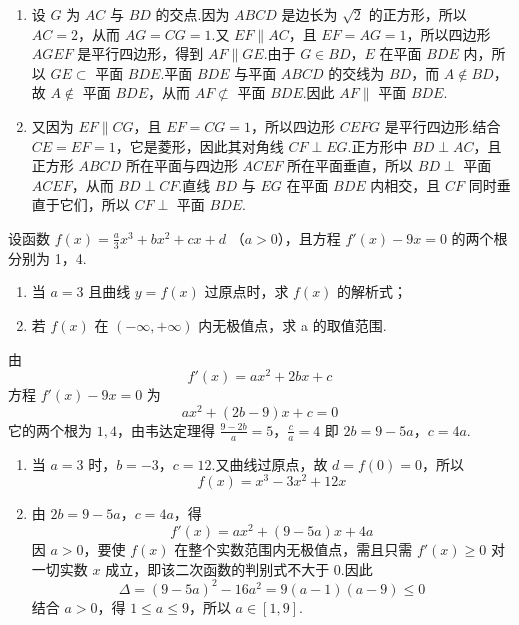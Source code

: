 \begin{solution}
\begin{enumerate}
\item 设 \(G\) 为 \(AC\) 与 \(BD\) 的交点.因为 \(ABCD\) 是边长为 \(\sqrt{2}\) 的正方形，所以 \(AC=2\)，从而 \(AG=CG=1\).又 \(EF\parallel AC\)，且 \(EF=AG=1\)，所以四边形 \(AGEF\) 是平行四边形，得到 \(AF\parallel GE\).由于 \(G\in BD\)，\(E\) 在平面 \(BDE\) 内，所以 \(GE\subset\) 平面 \(BDE\).平面 \(BDE\) 与平面 \(ABCD\) 的交线为 \(BD\)，而 \(A\notin BD\)，故 \(A\notin\) 平面 \(BDE\)，从而 \(AF\not\subset\) 平面 \(BDE\).因此 \(AF\parallel\) 平面 \(BDE\).

\item 又因为 \(EF\parallel CG\)，且 \(EF=CG=1\)，所以四边形 \(CEFG\) 是平行四边形.结合 \(CE=EF=1\)，它是菱形，因此其对角线 \(CF\perp EG\).正方形中 \(BD\perp AC\)，且正方形 \(ABCD\) 所在平面与四边形 \(ACEF\) 所在平面垂直，所以 \(BD\perp\) 平面 \(ACEF\)，从而 \(BD\perp CF\).直线 \(BD\) 与 \(EG\) 在平面 \(BDE\) 内相交，且 \(CF\) 同时垂直于它们，所以 \(CF\perp\) 平面 \(BDE\).

\end{enumerate}
\end{solution}

\begin{problem}
设函数 \( f(x) = \frac{a}{3} x^3 + bx^2 + cx + d\) （\(a > 0\)），且方程 \( f'(x) - 9x = 0 \) 的两个根分别为 1，4.

\begin{enumerate}
\item 当 \(a = 3\) 且曲线 \(y = f(x)\) 过原点时，求 \(f(x)\) 的解析式；
\item 若 \( f(x) \) 在 \( (-\infty,+\infty) \) 内无极值点，求 a 的取值范围.
\end{enumerate}
\end{problem}

\begin{solution}
由
\[
f'(x)=ax^2+2bx+c
\]
方程 \(f'(x)-9x=0\) 为
\[
ax^2+(2b-9)x+c=0
\]
它的两个根为 \(1,4\)，由韦达定理得
\(\frac{9-2b}{a}=5\)，\(\frac{c}{a}=4\)
即 \(2b=9-5a\)，\(c=4a\).

\begin{enumerate}
\item 当 \(a=3\) 时，\(b=-3\)，\(c=12\).又曲线过原点，故 \(d=f(0)=0\)，所以
\[
f(x)=x^3-3x^2+12x
\]

\item 由 \(2b=9-5a\)，\(c=4a\)，得
\[
f'(x)=ax^2+(9-5a)x+4a
\]
因 \(a>0\)，要使 \(f(x)\) 在整个实数范围内无极值点，需且只需 \(f'(x)\geqslant0\) 对一切实数 \(x\) 成立，即该二次函数的判别式不大于 \(0\).因此
\[
\Delta=(9-5a)^2-16a^2=9(a-1)(a-9)\leqslant0
\]
结合 \(a>0\)，得 \(1\leqslant a\leqslant9\)，所以 \(a\in[1,9]\).
\end{enumerate}
\end{solution}


